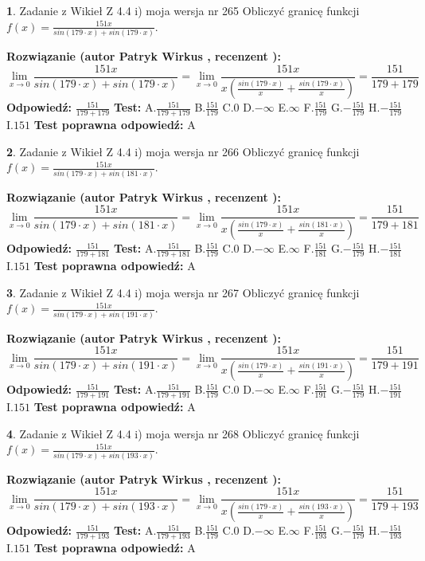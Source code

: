 \documentclass[12pt, a4paper]{article}
\theoremstyle{definition} %
\newtheorem{zad}{}
\newcommand{\zadStart}[1]{\begin{zad}#1\newline}
\newcommand{\zadStop}{\end{zad}}
\newcommand{\rozwStart}[2]{\noindent \textbf{Rozwiązanie (autor #1 , recenzent #2): }\newline}
\newcommand{\rozwStop}{\newline}
\newcommand{\odpStart}{\noindent \textbf{Odpowiedź:}\newline}
\newcommand{\odpStop}{\newline}
\newcommand{\testStart}{\noindent \textbf{Test:}\newline}
\newcommand{\testStop}{\newline}
\newcommand{\kluczStart}{\noindent \textbf{Test poprawna odpowiedź:}\newline}
\newcommand{\kluczStop}{\newline}
\begin{document}
\zadStart{Zadanie z Wikieł Z 4.4 i) moja wersja nr 265}
Obliczyć granicę funkcji $f(x)=\frac{151x}{sin(179\cdot x) +sin(179\cdot x)}$.
\zadStop
\rozwStart{Patryk Wirkus}{}
$$\lim\limits_{x\to 0}\frac{151x}{sin(179\cdot x) +sin(179\cdot x)}=\lim\limits_{x\to 0}\frac{151x}{x(\frac{sin(179\cdot x)}{x}+\frac{sin(179\cdot x)}{x})}=\frac{151}{179+179}$$
\rozwStop
\odpStart
$\frac{151}{179+179}$
\odpStop
\testStart
A.$\frac{151}{179+179}$
B.$\frac{151}{179}$
C.$0$
D.$-\infty$
E.$\infty$
F.$\frac{151}{179}$
G.$-\frac{151}{179}$
H.$-\frac{151}{179}$
I.$151$
\testStop
\kluczStart
A
\kluczStop



\zadStart{Zadanie z Wikieł Z 4.4 i) moja wersja nr 266}
Obliczyć granicę funkcji $f(x)=\frac{151x}{sin(179\cdot x) +sin(181\cdot x)}$.
\zadStop
\rozwStart{Patryk Wirkus}{}
$$\lim\limits_{x\to 0}\frac{151x}{sin(179\cdot x) +sin(181\cdot x)}=\lim\limits_{x\to 0}\frac{151x}{x(\frac{sin(179\cdot x)}{x}+\frac{sin(181\cdot x)}{x})}=\frac{151}{179+181}$$
\rozwStop
\odpStart
$\frac{151}{179+181}$
\odpStop
\testStart
A.$\frac{151}{179+181}$
B.$\frac{151}{179}$
C.$0$
D.$-\infty$
E.$\infty$
F.$\frac{151}{181}$
G.$-\frac{151}{179}$
H.$-\frac{151}{181}$
I.$151$
\testStop
\kluczStart
A
\kluczStop



\zadStart{Zadanie z Wikieł Z 4.4 i) moja wersja nr 267}
Obliczyć granicę funkcji $f(x)=\frac{151x}{sin(179\cdot x) +sin(191\cdot x)}$.
\zadStop
\rozwStart{Patryk Wirkus}{}
$$\lim\limits_{x\to 0}\frac{151x}{sin(179\cdot x) +sin(191\cdot x)}=\lim\limits_{x\to 0}\frac{151x}{x(\frac{sin(179\cdot x)}{x}+\frac{sin(191\cdot x)}{x})}=\frac{151}{179+191}$$
\rozwStop
\odpStart
$\frac{151}{179+191}$
\odpStop
\testStart
A.$\frac{151}{179+191}$
B.$\frac{151}{179}$
C.$0$
D.$-\infty$
E.$\infty$
F.$\frac{151}{191}$
G.$-\frac{151}{179}$
H.$-\frac{151}{191}$
I.$151$
\testStop
\kluczStart
A
\kluczStop



\zadStart{Zadanie z Wikieł Z 4.4 i) moja wersja nr 268}
Obliczyć granicę funkcji $f(x)=\frac{151x}{sin(179\cdot x) +sin(193\cdot x)}$.
\zadStop
\rozwStart{Patryk Wirkus}{}
$$\lim\limits_{x\to 0}\frac{151x}{sin(179\cdot x) +sin(193\cdot x)}=\lim\limits_{x\to 0}\frac{151x}{x(\frac{sin(179\cdot x)}{x}+\frac{sin(193\cdot x)}{x})}=\frac{151}{179+193}$$
\rozwStop
\odpStart
$\frac{151}{179+193}$
\odpStop
\testStart
A.$\frac{151}{179+193}$
B.$\frac{151}{179}$
C.$0$
D.$-\infty$
E.$\infty$
F.$\frac{151}{193}$
G.$-\frac{151}{179}$
H.$-\frac{151}{193}$
I.$151$
\testStop
\kluczStart
A
\kluczStop
\end{document}

